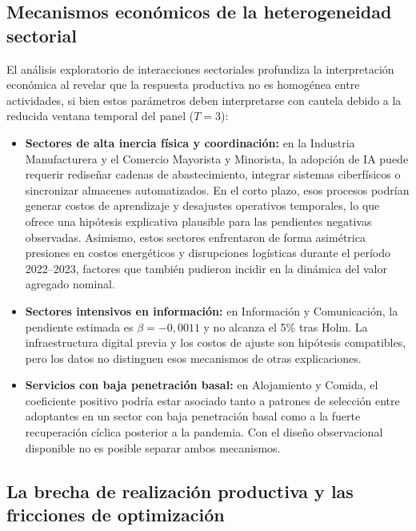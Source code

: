 \documentclass[12pt,a4paper]{article}
\begin{document}
\subsection{Mecanismos económicos de la heterogeneidad sectorial}

El análisis exploratorio de interacciones sectoriales profundiza la interpretación económica al revelar que la respuesta productiva no es homogénea entre actividades, si bien estos parámetros deben interpretarse con cautela debido a la reducida ventana temporal del panel ($T=3$):

\begin{itemize}

    \item \textbf{Sectores de alta inercia física y coordinación:} en la Industria Manufacturera y el Comercio Mayorista y Minorista, la adopción de IA puede requerir rediseñar cadenas de abastecimiento, integrar sistemas ciberfísicos o sincronizar almacenes automatizados. En el corto plazo, esos procesos podrían generar costos de aprendizaje y desajustes operativos temporales, lo que ofrece una hipótesis explicativa plausible para las pendientes negativas observadas. Asimismo, estos sectores enfrentaron de forma asimétrica presiones en costos energéticos y disrupciones logísticas durante el período 2022--2023, factores que también pudieron incidir en la dinámica del valor agregado nominal.

    \item \textbf{Sectores intensivos en información:} en Información y Comunicación, la pendiente estimada es $\beta=-0,0011$ y no alcanza el 5\% tras Holm. La infraestructura digital previa y los costos de ajuste son hipótesis compatibles, pero los datos no distinguen esos mecanismos de otras explicaciones.

    \item \textbf{Servicios con baja penetración basal:} en Alojamiento y Comida, el coeficiente positivo podría estar asociado tanto a patrones de selección entre adoptantes en un sector con baja penetración basal como a la fuerte recuperación cíclica posterior a la pandemia. Con el diseño observacional disponible no es posible separar ambos mecanismos.

\end{itemize}

\subsection{La brecha de realización productiva y las fricciones de optimización}
\end{document}
